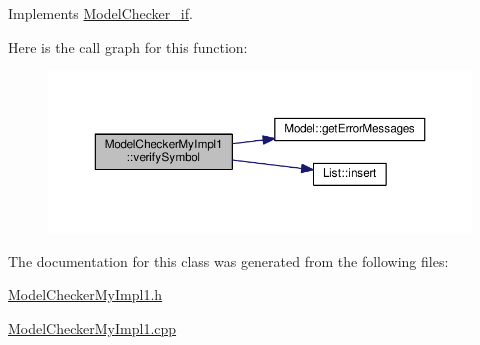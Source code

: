 Implements \hyperlink{class_model_checker__if_a36eada12fe9753f5c89099c572e27426}{Model\-Checker\-\_\-if}.



Here is the call graph for this function\-:\nopagebreak
\begin{figure}[H]
\begin{center}
\leavevmode
\includegraphics[width=350pt]{class_model_checker_my_impl1_af92c7b51b8207c1718b496df104b1f11_cgraph}
\end{center}
\end{figure}




The documentation for this class was generated from the following files\-:\begin{DoxyCompactItemize}
\item 
\hyperlink{_model_checker_my_impl1_8h}{Model\-Checker\-My\-Impl1.\-h}\item 
\hyperlink{_model_checker_my_impl1_8cpp}{Model\-Checker\-My\-Impl1.\-cpp}\end{DoxyCompactItemize}
